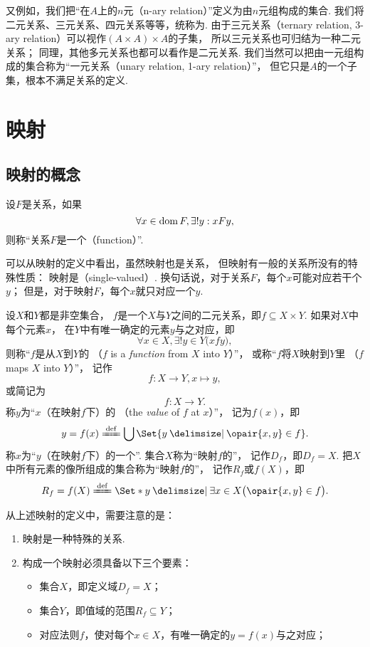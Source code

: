又例如，我们把“在\(A\)上的\(n\)元（n-ary relation）”定义为由\(n\)元组构成的集合.
我们将二元关系、三元关系、四元关系等等，统称为.
由于三元关系（ternary relation, 3-ary relation）可以视作\((A \times A) \times A\)的子集，
所以三元关系也可归结为一种二元关系；
同理，其他多元关系也都可以看作是二元关系.
我们当然可以把由一元组构成的集合称为“一元关系（unary relation, 1-ary relation）”，
但它只是\(A\)的一个子集，根本不满足关系的定义.

\section{映射}
\subsection{映射的概念}
\begin{definition}
设\(F\)是关系，如果\[
	\forall x \in \operatorname{dom} F, \exists! y:
	x F y,
\]
则称“关系\(F\)是一个（function）”.
\end{definition}
可以从映射的定义中看出，虽然映射也是关系，
但映射有一般的关系所没有的特殊性质：
映射是（single-valued）.
换句话说，对于关系\(F\)，每个\(x\)可能对应若干个\(y\)；
但是，对于映射\(F\)，每个\(x\)就只对应一个\(y\).

\begin{definition}
设\(X\)和\(Y\)都是非空集合，
\(f\)是一个\(X\)与\(Y\)之间的二元关系，即\(f \subseteq X \times Y\).
如果对\(X\)中每个元素\(x\)，
在\(Y\)中有唯一确定的元素\(y\)与之对应，即\[
	\forall x \in X,
	\exists! y \in Y
	\bigl( x f y \bigr),
\]
则称“\(f\)是从\(X\)到\(Y\)的%
（\(f\) is a \emph{function} from \(X\) into \(Y\)）”，
或称“\(f\)将\(X\)映射到\(Y\)里%
（\(f\) maps \(X\) into \(Y\)）”，
记作\[
	f\colon X \to Y, x \mapsto y,
\]或简记为\[
	f\colon X \to Y.
\]
称\(y\)为“\(x\)（在映射\(f\)下）的%
（the \emph{value} of \(f\) at \(x\)）”，
记为\(f(x)\)，即\[
	y = f(x)
	\defeq \bigcup\Set{ y \given \opair{x,y} \in f }.
\]
称\(x\)为“\(y\)（在映射\(f\)下）的一个”.
集合\(X\)称为“映射\(f\)的”，
记作\(D_f\)，即\(D_f = X\).
把\(X\)中所有元素的像所组成的集合称为“映射\(f\)的”，
记作\(R_f\)或\(f(X)\)，即\[
	R_f = f(X)
	\defeq \Set*{ y \given \exists x \in X \bigl( \opair{x,y} \in f \bigr) }.
\]
\end{definition}

从上述映射的定义中，需要注意的是：
\begin{enumerate}
	\item 映射是一种特殊的关系.
	\item 构成一个映射必须具备以下三个要素：\begin{itemize}
		\item 集合\(X\)，即定义域\(D_f = X\)；
		\item 集合\(Y\)，即值域的范围\(R_f \subseteq Y\)；
		\item 对应法则\(f\)，使对每个\(x \in X\)，有唯一确定的\(y=f(x)\)与之对应；
	\end{itemize}
\end{enumerate}

